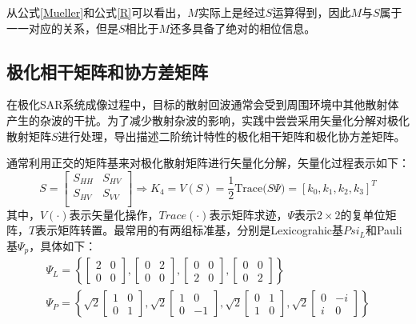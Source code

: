 从公式\eqref{Mueller}和公式\eqref{R}可以看出，$M$实际上是经过$S$运算得到，因此$M$与$S$属于一一对应的关系，但是$S$相比于$M$还多具备了绝对的相位信息。

\subsection{极化相干矩阵和协方差矩阵}
在极化SAR系统成像过程中，目标的散射回波通常会受到周围环境中其他散射体产生的杂波的干扰。为了减少散射杂波的影响，实践中尝尝采用矢量化分解对极化散射矩阵$S$进行处理，导出描述二阶统计特性的极化相干矩阵和极化协方差矩阵。

通常利用正交的矩阵基来对极化散射矩阵进行矢量化分解，矢量化过程表示如下：
\begin{equation}
  S=\left[ \begin{matrix}
      S_{HH} & S_{HV} \\
      S_{HV} & S_{VV} \\
    \end{matrix} \right] \Rightarrow K_4=V(S)=\frac{1}{2}\mathrm{Trace(}S\Psi )=\left[ k_0,k_1,k_2,k_3 \right] ^T
\end{equation}
其中，$V(\cdot)$表示矢量化操作，$Trace(\cdot)$表示矩阵求迹，$\Psi$表示$2\times2$的复单位矩阵，$T$表示矩阵转置。最常用的有两组标准基，分别是Lexicograhic基$Psi_L$和Pauli基$\Psi_p$，具体如下：
\begin{gather}
  \Psi_L=\left\{\left[\begin{array}{ll}
      2 & 0 \\
      0 & 0
    \end{array}\right],\left[\begin{array}{ll}
      0 & 2 \\
      0 & 0
    \end{array}\right],\left[\begin{array}{ll}
      0 & 0 \\
      2 & 0
    \end{array}\right],\left[\begin{array}{ll}
      0 & 0 \\
      0 & 2
    \end{array}\right]\right\}                                    \\
  \Psi_P=\left\{\sqrt{2}\left[\begin{array}{ll}
      1 & 0 \\
      0 & 1
    \end{array}\right], \sqrt{2}\left[\begin{array}{cc}
      1 & 0  \\
      0 & -1
    \end{array}\right], \sqrt{2}\left[\begin{array}{ll}
      0 & 1 \\
      1 & 0
    \end{array}\right], \sqrt{2}\left[\begin{array}{cc}
      0 & -i \\
      i & 0
    \end{array}\right]\right\}
\end{gather}

